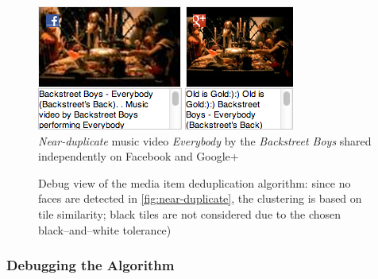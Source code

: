 \begin{figure}[b!]
  \centering
  \includegraphics[width=0.9\linewidth]{./backstreetboys.png}
  \caption{\emph{Near-duplicate} music video \emph{Everybody} by the \emph{Backstreet Boys} shared independently on Facebook and Google+}
  \label{fig:near-duplicate}
\end{figure}

\begin{figure}[t!]
  \centering
  \caption{Debug view of the media item deduplication algorithm:
  since no faces are detected in \autoref{fig:near-duplicate},
  the clustering is based on tile similarity;
  black tiles are not considered due to the chosen black--and--white tolerance)}
  \label{fig:algorithmdebug}
\end{figure}

\subsubsection{Debugging the Algorithm}
\label{sec:debugging-the-algorithm}

